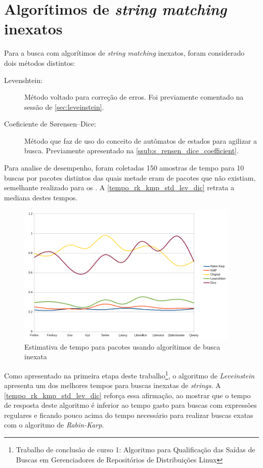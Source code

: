 \section{Algorítimos de \textit{string matching} inexatos} %
\label{sec:algor_timos_de_string_matching_inexatos}

Para a busca com algorítimos de \textit{string matching} inexatos, foram considerado dois métodos distintos:

\begin{description}
	\item[Levenshtein:] Método voltado para correção de erros. Foi previamente comentado na sessão de \ref{sec:leveinstein}.
	\item[Coeficiente de Sørensen–Dice:] Método que faz de uso do conceito de autômatos de estados para agilizar a busca. Previamente apresentado na \autoref{ssub:s_rensen_dice_coefficient}.
\end{description}

Para analise de desempenho, foram coletadas 150 amostras de tempo para 10 buscas por pacotes distintos das quais metade eram de pacotes que não existiam, semelhante realizado para os . A \autoref{tempo_rk_kmp_std_lev_dic} retrata a mediana destes tempos.

\begin{figure}[htbp]
  \centering
  \includegraphics[width=0.95\textwidth]{figuras/tempo-rk_kmp_std_lev_dice}
  \caption{Estimativa de tempo para pacotes usando algorítimos de busca inexata}
  \label{tempo_rk_kmp_std_lev_dic}
\end{figure}

Como apresentado na primeira etapa deste trabalho\footnote{Trabalho de conclusão de curso 1: Algoritmo para Qualificação das Saídas de Buscas em
Gerenciadores de Repositórios de Distribuições Linux}, o algoritmo de \textit{Leveinstein} apresenta um dos melhores tempos para buscas inexatas de \textit{strings}. A \autoref{tempo_rk_kmp_std_lev_dic} reforça essa afirmação, ao mostrar que o tempo de resposta deste algoritmo é inferior ao tempo gasto para buscas com expressões regulares e ficando pouco acima do tempo necessário para realizar buscas exatas com o algoritmo de  \textit{Rabin-Karp}.